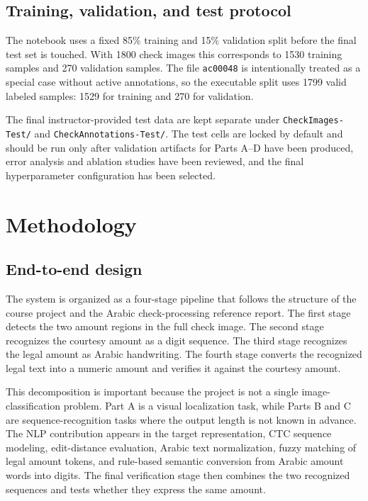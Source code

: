 \documentclass{article}
\begin{document}
\subsection{Training, validation, and test protocol}

The notebook uses a fixed 85\% training and 15\% validation split before the final test set is touched. With 1800 check images this corresponds to 1530 training samples and 270 validation samples. The file \texttt{ac00048} is intentionally treated as a special case without active annotations, so the executable split uses 1799 valid labeled samples: 1529 for training and 270 for validation.

The final instructor-provided test data are kept separate under \texttt{CheckImages-Test/} and \texttt{CheckAnnotations-Test/}. The test cells are locked by default and should be run only after validation artifacts for Parts A--D have been produced, error analysis and ablation studies have been reviewed, and the final hyperparameter configuration has been selected.

\section{Methodology}

\subsection{End-to-end design}

The system is organized as a four-stage pipeline that follows the structure of the course project and the Arabic check-processing reference report. The first stage detects the two amount regions in the full check image. The second stage recognizes the courtesy amount as a digit sequence. The third stage recognizes the legal amount as Arabic handwriting. The fourth stage converts the recognized legal text into a numeric amount and verifies it against the courtesy amount.

This decomposition is important because the project is not a single image-classification problem. Part A is a visual localization task, while Parts B and C are sequence-recognition tasks where the output length is not known in advance. The NLP contribution appears in the target representation, CTC sequence modeling, edit-distance evaluation, Arabic text normalization, fuzzy matching of legal amount tokens, and rule-based semantic conversion from Arabic amount words into digits. The final verification stage then combines the two recognized sequences and tests whether they express the same amount.
\end{document}
